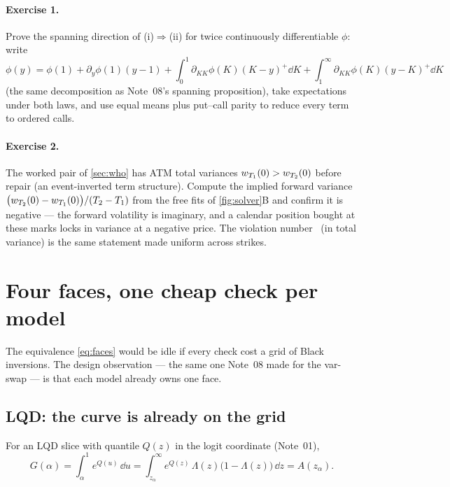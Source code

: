 \documentclass[11pt]{article}
\newcommand{\Lo}{\Lambda}
\begin{document}
\paragraph{Exercise 1.}
Prove the spanning direction of (i)$\Rightarrow$(ii) for twice
continuously differentiable $\phi$: write
\[
\phi(y)=\phi(1)+\partial_y\phi(1)(y-1)
+\int_0^{1}\partial_{KK}\phi(K)(K-y)^{+}\dd K
+\int_1^{\infty}\partial_{KK}\phi(K)(y-K)^{+}\dd K
\]
(the same decomposition as Note~08's spanning proposition), take
expectations under both laws, and use equal means plus put--call parity
to reduce every term to ordered calls.

\paragraph{Exercise 2.}
The worked pair of \cref{sec:who} has ATM total variances
$w_{T_1}(0)>w_{T_2}(0)$ before repair (an event-inverted term
structure).  Compute the implied forward variance
$\big(w_{T_2}(0)-w_{T_1}(0)\big)/(T_2-T_1)$ from the free fits
of \cref{fig:solver}B and confirm it is negative --- the forward
volatility is imaginary, and a calendar position bought at these marks
locks in variance at a negative price.
The violation number \calmviolfree\ (in total variance) is the same
statement made uniform across strikes.

\section{Four faces, one cheap check per model}
\label{sec:cheap}

The equivalence \eqref{eq:faces} would be idle if every check cost a
grid of Black inversions.  The design observation --- the same one
Note~08 made for the var-swap --- is that each model already owns one
face.

\subsection{LQD: the curve is already on the grid}

\begin{proposition}
\label{prop:GisA}
For an LQD slice with quantile $Q(z)$ in the logit coordinate
(Note~01),
\[
G(\alpha)=\int_\alpha^1 e^{Q(u)}\,\dd u
=\int_{z_\alpha}^{\infty}e^{Q(z)}\,\Lo(z)\big(1-\Lo(z)\big)\,\dd z
=A(z_\alpha).
\]
\end{proposition}
\end{document}
